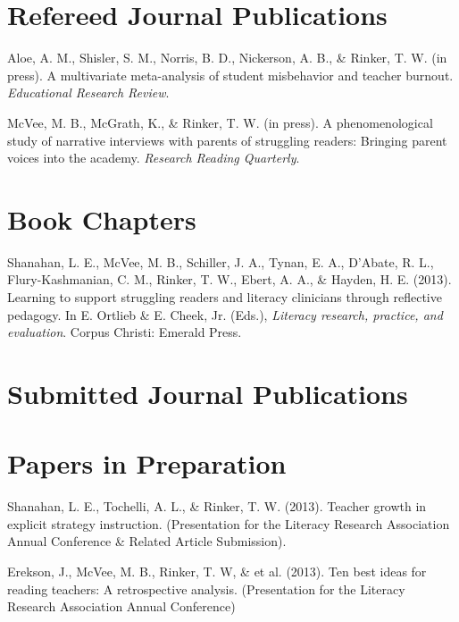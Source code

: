 \section{Refereed Journal Publications}
\vspace{-.1275in}
\begin{bibsection}
    \item Aloe, A. M., Shisler, S. M., Norris, B. D., Nickerson, A. B., \& Rinker, T. W. (in press). A multivariate meta-analysis of student misbehavior and teacher burnout. \emph{Educational Research Review}.
    \item McVee, M. B., McGrath, K., \& Rinker, T. W. (in press). A phenomenological study of narrative interviews with parents of struggling readers: Bringing parent voices into the academy. \emph{Research Reading Quarterly}.
\end{bibsection}

\halfblankline

\section{Book Chapters}
\vspace{-.1275in}
\begin{bibsection}
    \item Shanahan, L. E., McVee, M. B., Schiller, J. A., Tynan, E. A., D'Abate, R. L., Flury-Kashmanian, C. M., Rinker, T. W., Ebert, A. A., \& Hayden, H. E. (2013). Learning to support struggling readers and literacy clinicians through reflective pedagogy. In E. Ortlieb \& E. Cheek, Jr. (Eds.), \emph{Literacy research, practice, and evaluation}. Corpus Christi: Emerald Press.
\end{bibsection}

\section{Submitted Journal Publications}
\vspace{-.125in}
\begin{bibsection}
    \item 
\end{bibsection}


\halfblankline

\section{Papers in Preparation}
\vspace{-.1in}
\begin{bibsection}
    \item Shanahan, L. E., Tochelli, A. L., \& Rinker, T. W. (2013). Teacher growth in explicit strategy 
instruction. (Presentation for the Literacy Research Association Annual Conference \& Related Article Submission).

    \item Erekson, J., McVee, M. B., Rinker, T. W, \& et al. (2013). Ten best ideas for reading teachers: A retrospective analysis. (Presentation for the Literacy Research Association Annual Conference) 

\end{bibsection}


